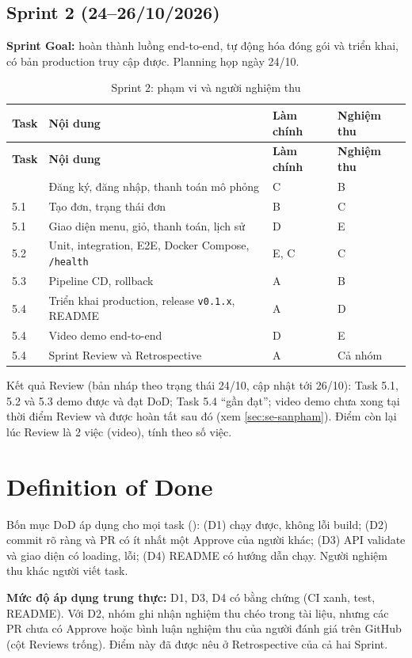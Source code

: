\subsection{Sprint 2 (24--26/10/2026)}
\textbf{Sprint Goal:} hoàn thành luồng end-to-end, tự động hóa đóng gói và triển khai, có bản production truy cập được. Planning họp ngày 24/10.
\begin{longtable}{@{}p{1cm}p{6.2cm}p{3.2cm}p{2.6cm}@{}}
\caption{Sprint 2: phạm vi và người nghiệm thu}\label{tab:sprint2}\\
\toprule \textbf{Task} & \textbf{Nội dung} & \textbf{Làm chính} & \textbf{Nghiệm thu} \\ \midrule \endfirsthead
\toprule \textbf{Task} & \textbf{Nội dung} & \textbf{Làm chính} & \textbf{Nghiệm thu} \\ \midrule \endhead
\bottomrule \endlastfoot
5.1 & Đăng ký, đăng nhập, thanh toán mô phỏng & C & B \\
5.1 & Tạo đơn, trạng thái đơn & B & C \\
5.1 & Giao diện menu, giỏ, thanh toán, lịch sử & D & E \\
5.2 & Unit, integration, E2E, Docker Compose, \texttt{/health} & E, C & C \\
5.3 & Pipeline CD, rollback & A & B \\
5.4 & Triển khai production, release \texttt{v0.1.x}, README & A & D \\
5.4 & Video demo end-to-end & D & E \\
5.4 & Sprint Review và Retrospective & A & Cả nhóm \\
\end{longtable}
Kết quả Review (bản nháp theo trạng thái 24/10, cập nhật tới 26/10): Task 5.1, 5.2 và 5.3 demo được và đạt DoD; Task 5.4 ``gần đạt''; video demo chưa xong tại thời điểm Review và được hoàn tất sau đó (xem \cref{sec:se-sanpham}). Điểm còn lại lúc Review là 2 việc (video), tính theo số việc.

\section{Definition of Done}\label{sec:se-dod}
Bốn mục DoD áp dụng cho mọi task (): (D1) chạy được, không lỗi build; (D2) commit rõ ràng và PR có ít nhất một Approve của người khác; (D3) API validate và giao diện có loading, lỗi; (D4) README có hướng dẫn chạy. Người nghiệm thu khác người viết task.

\textbf{Mức độ áp dụng trung thực:} D1, D3, D4 có bằng chứng (CI xanh, test, README). Với D2, nhóm ghi nhận nghiệm thu chéo trong tài liệu, nhưng các PR chưa có Approve hoặc bình luận nghiệm thu của người đánh giá trên GitHub (cột Reviews trống). Điểm này đã được nêu ở Retrospective của cả hai Sprint.
